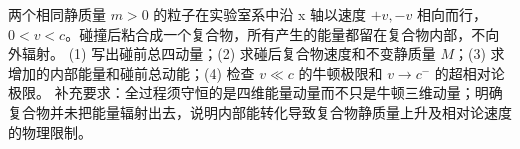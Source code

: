 两个相同静质量 \(m>0\) 的粒子在实验室系中沿 x 轴以速度 \(+v,-v\) 相向而行，\(0<v<c\)。碰撞后粘合成一个复合物，所有产生的能量都留在复合物内部，不向外辐射。
(1) 写出碰前总四动量；(2) 求碰后复合物速度和不变静质量 \(M\)；(3) 求增加的内部能量和碰前总动能；(4) 检查 \(v\ll c\) 的牛顿极限和 \(v\to c^{-}\) 的超相对论极限。
补充要求：全过程须守恒的是四维能量动量而不只是牛顿三维动量；明确复合物并未把能量辐射出去，说明内部能转化导致复合物静质量上升及相对论速度的物理限制。
